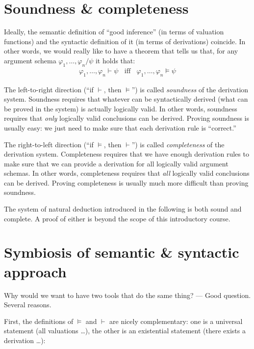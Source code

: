 \documentclass[nobib,nofonts]{tufte-handout}
\begin{document}
\section{Soundness \& completeness}

Ideally, the semantic definition of ``good inference'' (in terms of valuation functions) and the syntactic definition of it (in terms of derivations) coincide.
In other words, we would really like to have a theorem that tells us that, for any argument schema $\varphi_{1}, \dots, \varphi_{n} / \psi$ it holds that:
\begin{align*}
  \varphi_{1}, \dots, \varphi_{n} \vdash \psi \ \ \ \
  \text{iff} \ \ \ \
  \varphi_{1}, \dots, \varphi_{n} \models \psi
\end{align*}

The left-to-right direction (``if $\vdash$, then $\models$'') is called \emph{soundness} of the derivation system.
Soundness requires that whatever can be syntactically derived (what can be proved in the system) is actually logically valid.
In other words, soundness requires that \emph{only} logically valid conclusions can be derived.
Proving soundness is usually easy: we just need to make sure that each derivation rule is ``correct.''

The right-to-left direction (``if $\models$, then $\vdash$'') is called \emph{completeness} of the derivation system.
Completeness requires that we have enough derivation rules to make sure that we can provide a derivation for all logically valid argument schemas.
In other words, completeness requires that \emph{all} logically valid conclusions can be derived.
Proving completeness is usually much more difficult than proving soundness.

The system of natural deduction introduced in the following is both sound and complete.
A proof of either is beyond the scope of this introductory course.

\section{Symbiosis of semantic \& syntactic approach}

Why would we want to have two tools that do the same thing? ---
Good question.
Several reasons.

First, the definitions of $\models$ and $\vdash$ are nicely complementary: one is a universal statement (all valuations \dots), the other is an existential statement (there exists a derivation \dots):
\end{document}
